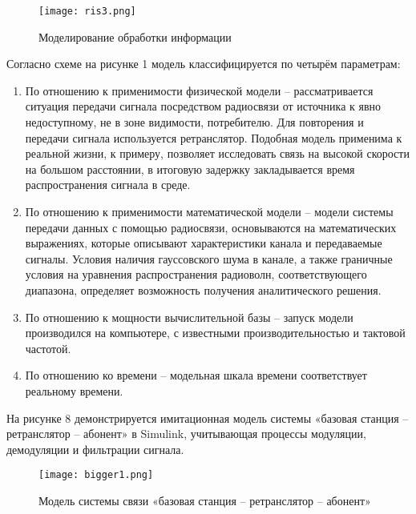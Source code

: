 \begin{onehalfspace}
\end{onehalfspace}
 
	\begin{center}
		\begin{figure}[h!]
			\centering
			\texttt{[image: ris3.png]}
			\caption{Моделирование обработки информации}
			\label{fig:model8}
		\end{figure}
	\end{center}

	\begin{onehalfspace}
	Согласно схеме на рисунке 1 модель классифицируется по четырём параметрам: 
	\begin{enumerate} 
		\item По отношению к применимости физической модели – рассматривается ситуация передачи сигнала посредством радиосвязи от источника к явно недоступному, не в зоне видимости, потребителю. Для повторения и передачи сигнала используется ретранслятор. Подобная модель применима к реальной жизни, к примеру, позволяет исследовать связь на высокой скорости на большом расстоянии, в итоговую задержку закладывается время распространения сигнала в среде.
		\item По отношению к применимости математической модели – модели системы передачи данных с помощью радиосвязи, основываются на математических выражениях, которые описывают характеристики канала и передаваемые сигналы. Условия наличия гауссовского шума в канале, а также граничные условия на уравнения распространения радиоволн, соответствующего диапазона, определяет возможность получения аналитического решения.
		\item По отношению к мощности вычислительной базы – запуск модели производился на компьютере, с известными производительностью и тактовой частотой.
		\item По отношению ко времени – модельная шкала времени соответствует реальному времени.
   \end{enumerate}
	
			
	 На рисунке 8 демонстрируется имитационная модель системы «базовая станция – ретранслятор – абонент» в Simulink, учитывающая процессы модуляции, демодуляции и фильтрации сигнала. 
\end{onehalfspace}
 
 \begin{center}
		\begin{figure}[h!]
			\centering
			\texttt{[image: bigger1.png]}
			\caption{Модель системы связи «базовая станция – ретранслятор – абонент»}
			\label{fig:model9}
		\end{figure}
	\end{center}

